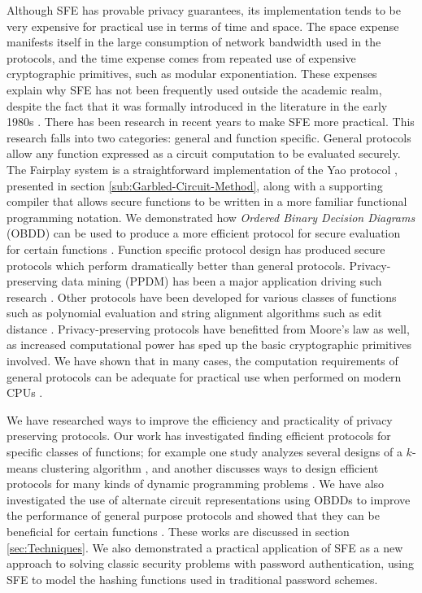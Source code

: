 Although SFE has provable privacy guarantees, its implementation tends
to be very expensive for practical use in terms of time and space.
The space expense manifests itself in the large consumption of network
bandwidth used in the protocols, and the time expense comes from repeated
use of expensive cryptographic primitives, such as modular exponentiation.
These expenses explain why SFE has not been frequently used outside
the academic realm, despite the fact that it was formally
introduced in the literature in the early 1980s \cite{Y82}. There has
been research in recent years to make SFE more practical. This research
falls into two categories: general and function specific. General
protocols allow any function expressed as a circuit computation to
be evaluated securely. The Fairplay system \cite{Fairplay} is a straightforward
implementation of the Yao protocol \cite{Yao86}, presented in section
\ref{sub:Garbled-Circuit-Method}, along with a supporting compiler
that allows secure functions to be written in a more familiar functional
programming notation. We demonstrated
how \emph{Ordered Binary Decision Diagrams} (OBDD)  can be used to
produce a more efficient protocol for secure evaluation for certain
functions \cite{kruger06}. Function specific protocol design has produced secure protocols
which perform dramatically better than general protocols. Privacy-preserving data mining (PPDM) has been a major application driving
such research \cite{verykios04stateart}. Other protocols have been
developed for various classes of functions such as polynomial evaluation
\cite{naor99otope} and string alignment algorithms such as edit distance
\cite{kruger07}.  Privacy-preserving protocols have benefitted from Moore's law as well,
as increased computational power has sped up the basic cryptographic primitives involved.
We have shown that in many
cases, the computation requirements of general protocols
can be adequate for practical use when performed on modern
CPUs \cite{kruger06,kruger10}.

We have researched ways to improve the efficiency and practicality
of privacy preserving protocols. Our work has investigated finding
efficient protocols for specific classes of functions; for example
one study analyzes several designs of a $k$-means clustering algorithm
\cite{kruger05}, and another discusses ways to design efficient protocols
for many kinds of dynamic programming problems \cite{kruger07}. We
have also investigated the use of alternate circuit representations
using OBDDs to improve the performance of general purpose protocols
and showed that they can be beneficial for certain functions \cite{kruger06}.
These works are discussed in section \ref{sec:Techniques}.
We also demonstrated a practical application of SFE as a new approach
to solving classic security problems with password authentication, using
SFE to model the hashing functions used in traditional password schemes.
\cite{kruger10}

